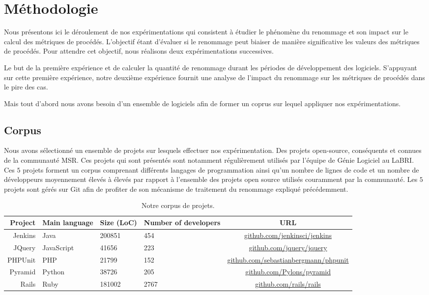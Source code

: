 \section{Méthodologie}
\label{sec:methodologie}

Nous présentons ici le déroulement de nos expérimentations qui consistent à étudier le phénomène du renommage et son impact sur le calcul des métriques de procédés. L’objectif étant d’évaluer si le renommage peut biaiser de manière significative les valeurs des métriques de procédés. Pour attendre cet objectif, nous réalisons deux expérimentations successives.

Le but de la première expérience et de calculer la quantité de renommage durant les périodes de développement des logiciels. S’appuyant sur cette première expérience, notre deuxième expérience fournit une analyse de l’impact du renommage sur les métriques de procédés dans le pire des cas. 

Mais tout d'abord nous avons besoin d'un ensemble de logiciels afin de former un coprus sur lequel appliquer nos expérimentations. 

\subsection{Corpus}

Nous avons sélectionné un ensemble de projets sur lesquels effectuer nos expérimentation. Des projets open-source, conséquents et connues de la communauté MSR. Ces projets qui sont présentés  sont notamment régulièrement utilisés par l'équipe de Génie Logiciel au LaBRI. Ces $5$ projets forment un corpus comprenant différents langages de programmation ainsi qu'un nombre de lignes de code et un nombre de développeurs moyennement élevés à élevés par rapport à l'ensemble des projets open source utilisés couramment par la communauté. Les $5$ projets sont gérés sur Git afin de profiter de son mécanisme de traitement du renommage expliqué précédemment. \\

\begin{table}[h]
\centering
\small
\begin{tabular}{rllp{1.7cm}c}
\toprule
Project & Main language & Size (LoC) & Number of developers & URL\\
\midrule
Jenkins & Java & 200851 & 454 & \url{github.com/jenkinsci/jenkins} \\
JQuery & JavaScript & 41656 & 223 & \url{github.com/jquery/jquery} \\
PHPUnit & PHP & 21799 & 152 & \url{github.com/sebastianbergmann/phpunit}\\
Pyramid & Python & 38726 & 205 & \url{github.com/Pylons/pyramid} \\
Rails & Ruby & 181002 & 2767 & \url{github.com/rails/rails}\\
\bottomrule
\end{tabular}
\caption{Notre corpus de projets.}
\label{tab:projects}
\end{table}

